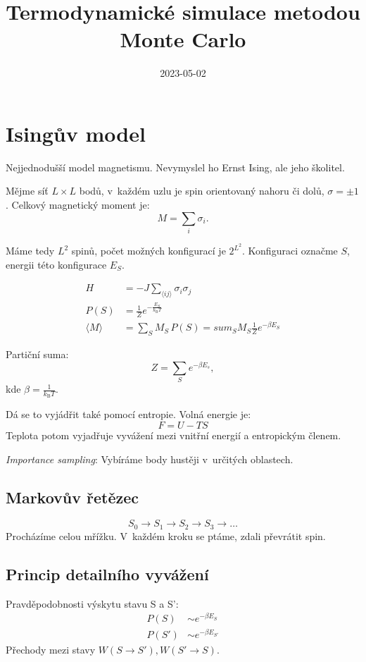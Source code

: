 \documentclass[a4paper]{article}
\title{Termodynamické simulace metodou Monte Carlo}
\date{2023-05-02}
\newcommand\boltzmann{k_\mathrm{B}}
\begin{document}
\section{Isingův model}
Nejjednodušší model magnetismu.
Nevymyslel ho Ernst Ising, ale jeho školitel.

Mějme síť $L \times L$ bodů, v~každém uzlu je spin
orientovaný nahoru či dolů, $\sigma = \pm 1$.
Celkový magnetický moment je:
\begin{equation}
    M = \sum_i \sigma_i.
\end{equation}

Máme tedy $L^2$ spinů, počet možných konfigurací je $2^{L^2}$.
Konfiguraci označme $S$, energii této konfigurace $E_S$.

\begin{align}
    H &= -J \sum_{\langle i j \rangle} \sigma_i \sigma_j
    \\
    P(S) &= \frac{1}{Z} e^{-\frac{E_S}{\boltzmann T}}
    \\
    \langle M \rangle &= \sum_S M_S \, P(S)
        = sum_S M_S \frac{1}{Z} e^{-\beta E_S}
\end{align}

Partiční suma:
\begin{equation}
    Z = \sum_S e^{-\beta E_s},
\end{equation}
kde $\beta = \frac{1}{\boltzmann T}$.

Dá se to vyjádřit také pomocí entropie. Volná energie je:
\begin{equation}
    F = U - TS
\end{equation}
Teplota potom vyjadřuje vyvážení mezi vnitřní energií a entropickým členem.

\emph{Importance sampling}: Vybíráme body hustěji v~určitých oblastech.

\subsection{Markovův řetězec}
\begin{equation}
    S_0 \rightarrow S_1 \rightarrow S_2 \rightarrow S_3 \rightarrow \dots
\end{equation}
Procházíme celou mřížku. V~každém kroku se ptáme, zdali převrátit spin.

\subsection{Princip detailního vyvážení}
Pravděpodobnosti výskytu stavu S a S':
\begin{align}
    P(S) &\sim e^{-\beta E_S}
    \\
    P(S') &\sim e^{-\beta E_{S'}}
\end{align}
Přechody mezi stavy $W(S \rightarrow S'), W(S' \rightarrow S)$.
\end{document}
